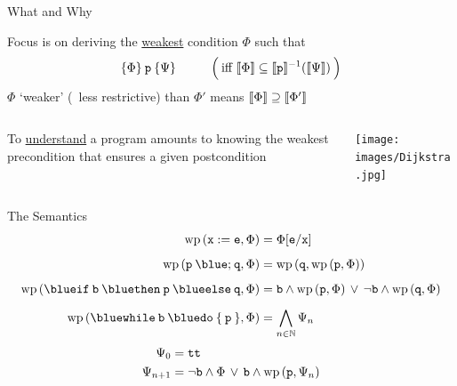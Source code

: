 \documentclass{beamer}
\begin{document}
\begin{frame}{What and Why}

        Focus is on deriving the \alert{\underline{weakest}} condition $\Phi$ such that
        \[
                \{ \Phi \} \> \mathtt{p} \> \{ \Psi \}   \hspace{1cm}
                \Big ( \> \text{iff } \llbracket \Phi \rrbracket \subseteq \llbracket \mathtt{p} \rrbracket^{-1}(\llbracket \Psi \rrbracket) \> \Big )
        \]
        \pause
        $\Phi$ `weaker' (\ie\ less restrictive) than $\Phi'$ means $\llbracket \Phi \rrbracket \supseteq \llbracket \Phi' \rrbracket$

        \pause
        \bigskip
        \bigskip
        \begin{minipage}[0.3\textheight]{\textwidth}
                \begin{columns}[c]
                \begin{column}{0.7\textwidth}
                        To \alert{\underline{understand}} a program amounts to knowing the weakest
                        precondition that ensures a given postcondition
                \end{column}
                \begin{column}{0.22\textwidth}
                        \texttt{[image: images/Dijkstra.jpg]}
                \end{column}
                \end{columns}
       \end{minipage}
\end{frame}

\begin{frame}{The Semantics}
        \begin{align*}
                \mathrm{wp}\,(\prog{x : = e}, \Phi) & = \Phi[\prog{e}/\prog{x}] \\[5pt]
                \mathrm{wp}\,(\prog{p} \> {\blue ;} \> \prog{q}, \Phi) & 
                = \mathrm{wp} \, (\prog{q}, \mathrm{wp} \, (\prog{p}, \Phi))  \\[5pt]
                \mathrm{wp}\,({\mathtt{{\blue if} \> b \> {\blue then} \> p \> {\blue else} \> q}}, \Phi)
                & 
                =
                \prog{b} \wedge \mathrm{wp}\, (\prog{p},\Phi) \, \vee \,
                \prog{\neg b} \wedge \mathrm{wp} \, (\prog{q}, \Phi)
                \\[5pt]
                \mathrm{wp} \, ({\mathtt{{\blue while} \> b \> {\blue do} \> \{ \> p \> \}} }, \Phi)
                & = \bigwedge_{n \in \Nats} \Psi_n
        \end{align*}
        \pause
        \vspace{-0.5cm}
        \begin{align*}
                \Psi_0 & = \mathtt{tt} \\
                \Psi_{n+1} & = \neg \mathtt{b} \wedge \Phi \, \vee \, \mathtt{b} \wedge 
                \mathrm{wp} \, (\mathtt{p}, \Psi_n)
        \end{align*}
\end{frame}
\end{document}
